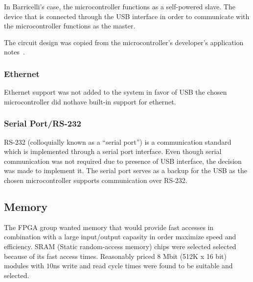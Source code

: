 In Barricelli's case, the microcontroller functions as a self-powered slave.
The device that is connected through the USB interface in order to communicate with the microcontroller functions as the master.

The circuit design was copied from the microcontroller's developer's application notes~\cite[Figure 2.2]{an0046}.


\subsubsection{Ethernet}
Ethernet support was not added to the system in favor of USB the chosen microcontroller did nothave built-in support for ethernet.


\subsubsection{Serial Port/RS-232} 
RS-232 (colloquially known as a ``serial port'') is a communication standard which is implemented through a serial port interface.
Even though serial communication was not required due to presence of USB interface, the decision was made to implement it.
The serial port serves as a backup for the USB as the chosen microcontroller supports communication over RS-232.

\subsection{Memory} \label{pcb:design-choices:ss:memory}
The FPGA group wanted memory that would provide fast accesses in combination with a large input/output capasity in order maximize speed and efficiency.
SRAM (Static random-access memory) chips were selected selected because of its fast access times.
Reasonably priced 8 Mbit (512K x 16 bit) modules with $10$ns write and read cycle times were found to be suitable and selected. 

